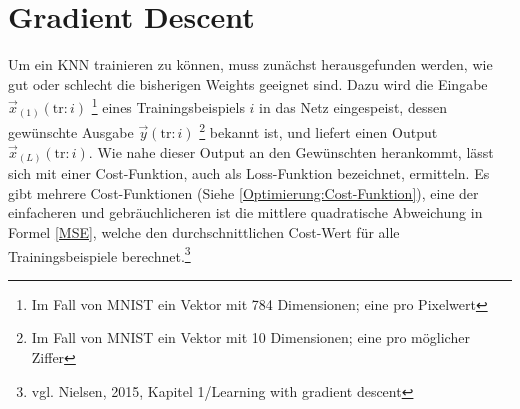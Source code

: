 \documentclass[a4paper,12pt,ngerman,oneside]{scrreprt}	%
\newcommand{\practitioner}[1]{vgl. Gibson \& Patterson, 2017, S. {#1}}
\begin{document}
	
	
		\section{Gradient Descent}\label{GradientDescent}
			Um ein KNN trainieren zu können, muss zunächst herausgefunden werden, wie gut oder schlecht die bisherigen Weights geeignet sind. Dazu wird die Eingabe\break\mbox{$\vec{x}_{(1)}(\textrm{tr}:i)$} \footnote{Im Fall von MNIST ein Vektor mit 784 Dimensionen; eine pro Pixelwert} eines Trainingsbeispiels $i$ in das Netz eingespeist, dessen gewünschte Ausgabe \mbox{$\vec{y}(\textrm{tr}:i)$} \footnote{Im Fall von MNIST ein Vektor mit 10 Dimensionen; eine pro möglicher Ziffer} bekannt ist, und liefert einen Output \mbox{$\vec{x}_{(L)}(\textrm{tr}:i)$}. Wie nahe dieser Output an den Gewünschten herankommt, lässt sich mit einer Cost-Funktion, auch als Loss-Funktion bezeichnet, ermitteln. Es gibt mehrere Cost-Funktionen (Siehe \ref{Optimierung:Cost-Funktion}), eine der einfacheren und gebräuchlicheren ist die mittlere quadratische Abweichung in Formel \ref{MSE}, welche den durchschnittlichen Cost-Wert für alle Trainingsbeispiele berechnet.\footnote{vgl. Nielsen, 2015, Kapitel 1/Learning with gradient descent}
			
\end{document}

